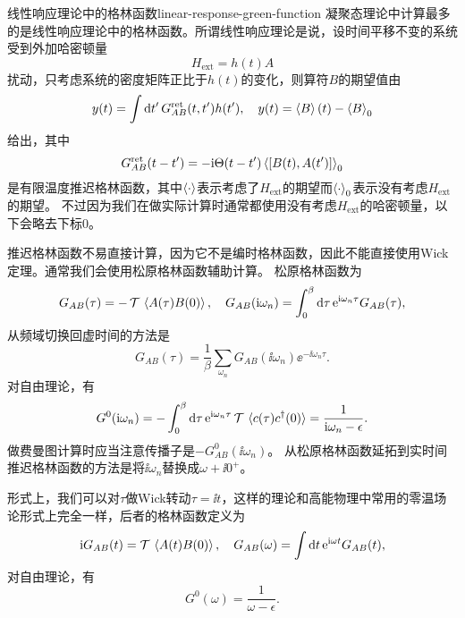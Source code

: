 \begin{back}{线性响应理论中的格林函数}{linear-response-green-function}
    凝聚态理论中计算最多的是线性响应理论中的格林函数。所谓线性响应理论是说，设时间平移不变的系统受到外加哈密顿量
    \begin{equation}
        H_\text{ext} = h(t) A
    \end{equation}
    扰动，只考虑系统的密度矩阵正比于$h(t)$的变化，则算符$B$的期望值由
    \begin{equation}
        y(t) = \int \dd{t'} G^\text{ret}_{AB}(t, t') h(t'), \quad y(t) = \expval{B}(t) - \expval{B}_0
    \end{equation}
    给出，其中
    \begin{equation}
        G^\text{ret}_{AB}(t-t') = - \mathrm{i} \Theta(t-t') \expval{[B(t), A(t')]}_0
    \end{equation}
    是有限温度推迟格林函数，其中$\expval{\cdot}$表示考虑了$H_\text{ext}$的期望而$\expval{\cdot}_0$表示没有考虑$H_\text{ext}$的期望。
    不过因为我们在做实际计算时通常都使用没有考虑$H_\text{ext}$的哈密顿量，以下会略去下标$0$。

    推迟格林函数不易直接计算，因为它不是编时格林函数，因此不能直接使用Wick定理。通常我们会使用松原格林函数辅助计算。
    松原格林函数为
    \begin{equation}
        G_{AB}(\tau) = - \operatorname{\mathcal{T}} \expval*{A(\tau) B(0)}, \quad G_{AB}(\mathrm{i} \omega_n) = \int_0^\beta \dd{\tau} \mathrm{e}^{\mathrm{i} \omega_n \tau} G_{AB}(\tau),
    \end{equation}
    从频域切换回虚时间的方法是
    \begin{equation}
        G_{AB}(\tau) = \frac{1}{\beta} \sum_{\omega_n} G_{AB}(\ii \omega_n) \ee^{- \ii \omega_n \tau}.
    \end{equation}
    对自由理论，有
    \begin{equation}
        G^{0}(\mathrm{i} \omega_n) = - \int_0^\beta \dd{\tau} \mathrm{e}^{\mathrm{i} \omega_n \tau} \operatorname{\mathcal{T}} \expval*{c(\tau) c^\dagger(0)} = \frac{1}{\mathrm{i} \omega_n - \epsilon}.
    \end{equation}
    做费曼图计算时应当注意传播子是$-G^{0}_{AB}(\ii \omega_n)$。
    从松原格林函数延拓到实时间推迟格林函数的方法是将$\ii \omega_n$替换成$\omega + \ii 0^+$。

    形式上，我们可以对$\tau$做Wick转动$\tau = \ii t$，这样的理论和高能物理中常用的零温场论形式上完全一样，后者的格林函数定义为
    \begin{equation}
        \mathrm{i} G_{AB}(t) = \operatorname{\mathcal{T}} \expval*{A(t) B(0)}, \quad G_{AB}(\omega) = \int \dd{t} \mathrm{e}^{\mathrm{i} \omega t} G_{AB}(t),
    \end{equation}
    对自由理论，有
    \begin{equation}
        G^0(\omega) = \frac{1}{\omega - \epsilon}.
    \end{equation}


\end{back}
